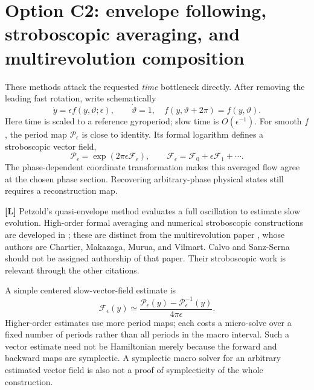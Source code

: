 \documentclass[10pt,a4paper]{article}
\newcommand{\lit}{\textbf{[L]}}
\begin{document}
\section{Option C2: envelope following, stroboscopic averaging, and multirevolution composition}
\label{sec:strobe}
These methods attack the requested \emph{time} bottleneck directly. After removing the leading fast rotation, write schematically
\begin{equation}\label{eq:fastslow}
 \dot y=\epsilon f(y,\vartheta;\epsilon),\qquad \dot\vartheta=1,
 \quad f(y,\vartheta+2\pi)=f(y,\vartheta).
\end{equation}
Here time is scaled to a reference gyroperiod; slow time is $O(\epsilon^{-1})$. For smooth $f$, the period map $\mathcal P_\epsilon$ is close to identity. Its formal logarithm defines a stroboscopic vector field,
\begin{equation}
 \mathcal P_\epsilon=\exp(2\pi\epsilon\mathcal F_\epsilon),\qquad
 \mathcal F_\epsilon=\mathcal F_0+\epsilon\mathcal F_1+\cdots.
\end{equation}
The phase-dependent coordinate transformation makes this averaged flow agree at the chosen phase section. Recovering arbitrary-phase physical states still requires a reconstruction map.

\lit{} Petzold's quasi-envelope method \cite{petzold} evaluates a full oscillation to estimate slow evolution. High-order formal averaging and numerical stroboscopic constructions are developed in \cite{higheraverage,stroboscopic}; these are distinct from the multirevolution paper \cite{mrcm}, whose authors are Chartier, Makazaga, Murua, and Vilmart. Calvo and Sanz-Serna should not be assigned authorship of that paper. Their stroboscopic work is relevant through the other citations.

A simple centered slow-vector-field estimate is
\begin{equation}
 \mathcal F_\epsilon(y)\simeq
 \frac{\mathcal P_\epsilon(y)-\mathcal P_\epsilon^{-1}(y)}{4\pi\epsilon}.
\end{equation}
Higher-order estimates use more period maps; each costs a micro-solve over a fixed number of periods rather than all periods in the macro interval. Such a vector estimate need not be Hamiltonian merely because the forward and backward maps are symplectic. A symplectic macro solver for an arbitrary estimated vector field is also not a proof of symplecticity of the whole construction.
\end{document}
